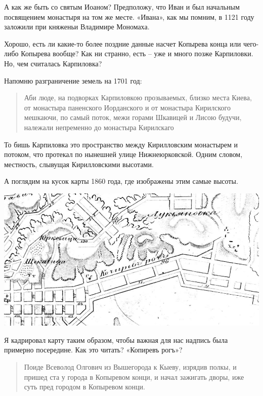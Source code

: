 \documentclass[a5paper,11pt,openany]{article}
\begin{document}
А как же быть со святым Иоаном? Предположу, что Иван и был начальным посвящением монастыря на том же месте. «Ивана», как мы помним, в 1121 году заложили при княженьи Владимире Мономаха.

Хорошо, есть ли какие-то более поздние данные насчет Копырева конца или чего-либо Копырева вообще? Как ни странно, есть – уже и много позже Карпиловки. Но, чем считалась Карпиловка?

Напомню разграничение земель на 1701 год:

\begin{quotation}
\noindent Аби люде, на подворках Карпиловкою прозываемых, близко места Киева, от монастыра паненского Иорданского и от монастыра Кирилского мешкаючи, по самый поток, межи горами Шкавицей и Лисою будучи, належали непременно до монастыра Кирилскаго
\end{quotation}

То бишь Карпиловка это пространство между Кирилловским монастырем и потоком, что протекал по нынешней улице Нижнеюрковской. Одним словом, местность, слывущая Кирилловскими высотами.

А поглядим на кусок карты 1860 года, где изображены этим самые высоты.

\begin{center}
\includegraphics[width=\linewidth]{1860.png}
\end{center}

Я кадрировал карту таким образом, чтобы важная для нас надпись была примерно посередине. Как это читать? «Копиревъ рогъ»? 

\begin{quotation}
\noindent Поиде Всеволод Олгович из Вышегорода к Кыеву, изрядив полкы, и пришед ста у города в Копыревом конци, и начал зажигать дворы, иже суть пред городом в Копыревом конци.
\end{quotation}
\end{document}
